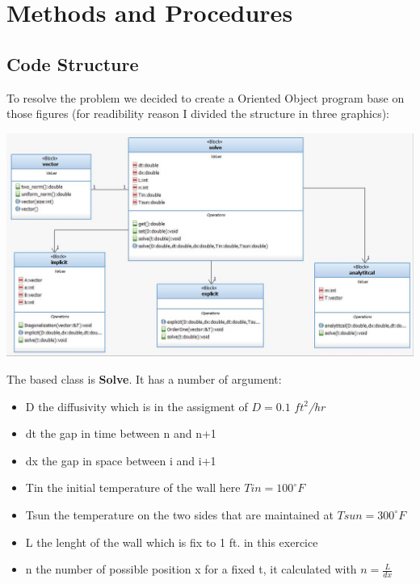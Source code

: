 \documentclass [10 pt, a4 paper]{article}
\begin{document}

\section{Methods and Procedures}
\subsection{Code Structure}

    To resolve the problem we decided to create a Oriented Object program base on 
those figures (for readibility reason I divided the structure in three graphics):
\begin{center}
    \includegraphics[scale=0.6]{General.JPG}
\end{center}
The based class is \textbf{Solve}. It has a number of argument:
\begin{itemize}
    \item D the diffusivity which is in the assigment of $D = 0.1$  \textit{$ft^{2}$/hr}
    \item dt the gap in time between n and n+1
    \item dx the gap in space between i and i+1
    \item Tin the initial temperature of the wall here $Tin = 100^{\circ}F$
    \item Tsun the temperature on the two sides that are maintained at $Tsun = 300^{\circ}F$
    \item L the lenght of the wall which is fix to 1 ft. in this exercice
    \item n the number of possible position x for a fixed t, it calculated with $n = \frac{L}{dx}$
\end{itemize}
\end{document}
